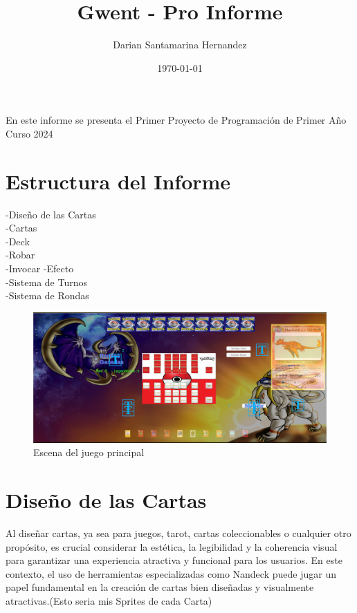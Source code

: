 \documentclass{article}
\title{Gwent - Pro Informe}
\author{Darian Santamarina Hernandez}
\date{\today}
\begin{document}
\maketitle
En este informe se presenta el Primer Proyecto de Programación de Primer Año Curso 2024
\centering
\setcounter{secnumdepth}{0}
\section{Estructura del Informe}
-Diseño de las Cartas\\
-Cartas\\
-Deck\\
-Robar\\
-Invocar
-Efecto\\
-Sistema de Turnos\\
-Sistema de Rondas\\
\begin{figure}
\centering
\includegraphics[width =1\textwidth]
{1}
\caption{Escena del juego principal}
\label{fig : a}
\end{figure}
\newpage
\centering
\setcounter{secnumdepth}{0}
\section{Diseño de las Cartas}
Al diseñar cartas, ya sea para juegos, tarot, cartas coleccionables o cualquier otro propósito, es crucial considerar la estética, la legibilidad y la coherencia visual para garantizar una experiencia atractiva y funcional para los usuarios. En este contexto, el uso de herramientas especializadas como Nandeck puede jugar un papel fundamental en la creación de cartas bien diseñadas y visualmente atractivas.(Esto seria mis Sprites de cada Carta)
\end{document}
